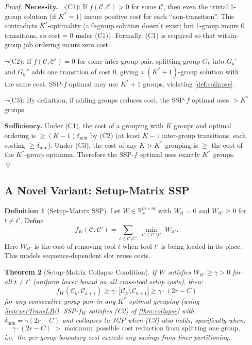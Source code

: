 \documentclass[11pt,a4paper]{article}
\theoremstyle{plain}
\newtheorem{theorem}{Theorem}[section]
\theoremstyle{definition}
\newtheorem{definition}[theorem]{Definition}
\newcommand{\Kstar}{K^{*}}          %
\begin{document}
\begin{proof}
\textbf{Necessity.}
$\lnot$(C1): If $f(\mathcal{C},\mathcal{C}) > 0$ for some $\mathcal{C}$, then even the
trivial 1-group solution (if $\Kstar = 1$) incurs positive cost for each ``non-transition''.
This contradicts $\Kstar$-optimality (a 0-group solution doesn't exist; but 1-group incurs
0 transitions, so cost = 0 under (C1)). Formally, (C1) is required so that within-group
job ordering incurs zero cost. \checkmark

$\lnot$(C2): If $f(\mathcal{C}, \mathcal{C}') = 0$ for some inter-group pair, splitting
group $G_k$ into $G_k'$ and $G_k''$ adds one transition of cost $0$, giving a
$(\Kstar+1)$-group solution with the same cost. SSP-$f$ optimal may use $\Kstar+1$ groups,
violating \cref{def:collapse}. \checkmark

$\lnot$(C3): By definition, if adding groups reduces cost, the SSP-$f$ optimal uses
$> \Kstar$ groups. \checkmark

\textbf{Sufficiency.}
Under (C1), the cost of a grouping with $K$ groups and optimal ordering is
$\ge (K-1)\delta_{\min}$ by (C2) (at least $K-1$ inter-group transitions, each costing
$\ge \delta_{\min}$).
Under (C3), the cost of any $K > \Kstar$ grouping is $\ge$ the cost of the
$\Kstar$-group optimum.
Therefore the SSP-$f$ optimal uses exactly $\Kstar$ groups. \qed
\end{proof}

\subsection{A Novel Variant: Setup-Matrix SSP}
\label{sec:setup-matrix}

\begin{definition}[Setup-Matrix SSP]
Let $W \in \mathbb{R}^{m \times m}_+$ with $W_{tt} = 0$ and $W_{tt'} \ge 0$ for $t \ne t'$.
Define
\[
  f_W(\mathcal{C}, \mathcal{C}')
  = \sum_{t \in \mathcal{C} \setminus \mathcal{C}'}\;
    \min_{t' \in \mathcal{C}' \setminus \mathcal{C}}\; W_{tt'}.
\]
Here $W_{tt'}$ is the cost of removing tool $t$ when tool $t'$ is being loaded in its
place. This models sequence-dependent slot reuse costs.
\end{definition}

\begin{thmbox}
\begin{theorem}[Setup-Matrix Collapse Condition]
\label{thm:setup-matrix}
If $W$ satisfies $W_{tt'} \ge \gamma > 0$ for all $t \ne t'$ (uniform lower bound
on all cross-tool setup costs), then:
\[
  f_W(\mathcal{C}_k, \mathcal{C}_{k+1})
  \ge \gamma \cdot |\mathcal{C}_k \setminus \mathcal{C}_{k+1}|
  \ge \gamma \cdot (2r - C)
\]
for any consecutive group pair in any $\Kstar$-optimal grouping (using \cref{lem:perTransLB}).
SSP-$f_W$ satisfies (C2) of \cref{thm:collapse} with $\delta_{\min} = \gamma(2r-C)$
and collapses to JGP when (C3) also holds, specifically when:
\[
  \gamma \cdot (2r - C) \;>\; \text{maximum possible cost reduction from splitting one group},
\]
i.e.\ the per-group-boundary cost exceeds any savings from finer partitioning.
\end{theorem}
\end{thmbox}
\end{document}
